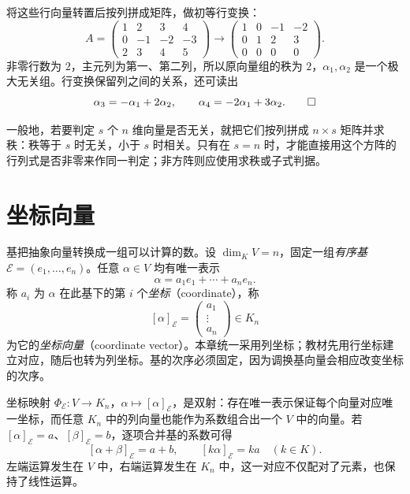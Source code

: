 \begin{solve}
将这些行向量转置后按列拼成矩阵，做初等行变换：
\[
    A=\begin{pmatrix}1&2&3&4\\0&-1&-2&-3\\2&3&4&5\end{pmatrix}
    \longrightarrow
    \begin{pmatrix}1&0&-1&-2\\0&1&2&3\\0&0&0&0\end{pmatrix}.
\]
非零行数为 $2$，主元列为第一、第二列，所以原向量组的秩为 $2$，$\alpha_1,\alpha_2$ 是一个极大无关组。行变换保留列之间的关系，还可读出
\[
    \alpha_3=-\alpha_1+2\alpha_2,\qquad
    \alpha_4=-2\alpha_1+3\alpha_2.\qedhere
\]
\end{solve}

一般地，若要判定 $s$ 个 $n$ 维向量是否无关，就把它们按列拼成 $n\times s$ 矩阵并求秩：秩等于 $s$ 时无关，小于 $s$ 时相关。只有在 $s=n$ 时，才能直接用这个方阵的行列式是否非零来作同一判定；非方阵则应使用求秩或子式判据。

\section{坐标向量}
\label{sec:coordinate-vectors}

基把抽象向量转换成一组可以计算的数。设 $\dim_K V=n$，固定一组\emph{有序基} $\mathcal E=(e_1,\ldots,e_n)$。任意 $\alpha\in V$ 均有唯一表示
\[
    \alpha=a_1e_1+\cdots+a_ne_n.
\]
称 $a_i$ 为 $\alpha$ 在此基下的第 $i$ 个\emph{坐标}（coordinate），称
\begin{equation}
\label{eq:coordinate-column-definition}
    [\alpha]_{\mathcal E}=\begin{pmatrix}a_1\\\vdots\\a_n\end{pmatrix}\in K_n
\end{equation}
为它的\emph{坐标向量}（coordinate vector）。本章统一采用列坐标；教材先用行坐标建立对应，随后也转为列坐标。基的次序必须固定，因为调换基向量会相应改变坐标的次序。

坐标映射 $\Phi_{\mathcal E}:V\to K_n$，$\alpha\mapsto[\alpha]_{\mathcal E}$，是双射：存在唯一表示保证每个向量对应唯一坐标，而任意 $K_n$ 中的列向量也能作为系数组合出一个 $V$ 中的向量。若 $[\alpha]_{\mathcal E}=a$、$[\beta]_{\mathcal E}=b$，逐项合并基的系数可得
\begin{equation}
\label{eq:coordinate-map-linearity}
    [\alpha+\beta]_{\mathcal E}=a+b,\qquad
    [k\alpha]_{\mathcal E}=ka\quad(k\in K).
\end{equation}
左端运算发生在 $V$ 中，右端运算发生在 $K_n$ 中，这一对应不仅配对了元素，也保持了线性运算。

